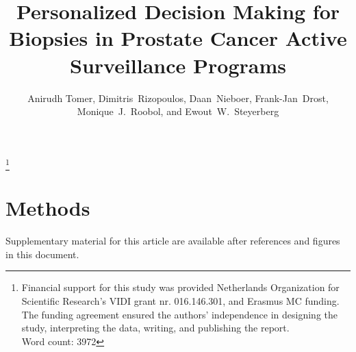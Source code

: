 \documentclass[Review,sagev,times]{sagej}
\begin{document}

\title{Personalized Decision Making for Biopsies in Prostate Cancer Active Surveillance Programs}

\author{Anirudh Tomer, Dimitris~Rizopoulos, Daan~Nieboer, Frank-Jan~Drost, Monique~J.~Roobol, and Ewout~W.~Steyerberg}







\maketitle

\footnote{Financial support for this study was provided Netherlands Organization for Scientific Research's VIDI grant nr. 016.146.301, and Erasmus MC funding. The funding agreement ensured the authors’ independence in designing the study, interpreting the data, writing, and publishing the report.\\Word count: 3972}
\thefootnote



\section{Methods}
\label{sec:methods}











\begin{sm}
Supplementary material for this article are available after references and figures in this document.
\end{sm} 



\end{document}
